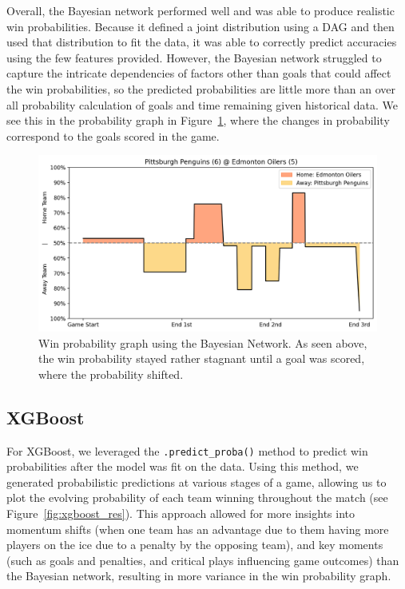 \documentclass[11pt]{article}
\begin{document}
Overall, the Bayesian network performed well and was able to produce realistic win probabilities. Because it defined a joint distribution using a DAG and
then used that distribution to fit the data, it was able to correctly predict accuracies using the few features provided. However, the Bayesian network struggled to capture the intricate dependencies of factors other than goals that could affect the win probabilities, so the predicted probabilities are little more than an over all probability calculation of goals and time remaining given historical data.
We see this in the probability graph in Figure~\ref{fig:bayesian_graph}, where the changes in probability correspond to the goals scored in the game. 

\begin{figure}
    \centering
    \includegraphics[width=\textwidth]{images/good_bayesian_example.png}
    \caption{Win probability graph using the Bayesian Network. As seen above, the win probability stayed rather stagnant until a goal was scored, where the probability shifted.}
    \label{fig:bayesian_graph}
\end{figure}

\subsection{XGBoost}

For XGBoost, we leveraged the {\tt .predict\_proba()} method to predict win probabilities after the model was fit on the data.
Using this method, we generated 
probabilistic predictions at various stages of a game, allowing us to 
plot the evolving probability of each team winning throughout the match
(see Figure~\ref{fig:xgboost_res}). 
This approach allowed for more insights into momentum shifts (when one team 
has an advantage due to them having more players on the ice due to 
a penalty by the opposing team), and key moments (such as goals and 
penalties, and critical plays influencing game outcomes) than the Bayesian network, resulting in more variance in the win probability graph.
\end{document}
